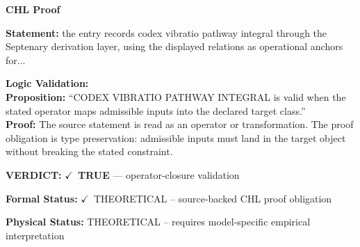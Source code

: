 \vspace{0.45em}
\noindent\textbf{CHL Proof}\par
\textbf{Statement:} the entry records codex vibratio pathway integral through the Septenary derivation
layer, using the displayed relations as operational anchors for...

\textbf{Logic Validation:}\\
\textbf{Proposition:} ``CODEX VIBRATIO PATHWAY INTEGRAL is valid when the stated operator maps admissible inputs
into the declared target class.''\\
\textbf{Proof:} The source statement is read as an operator or transformation. The proof obligation is
type preservation: admissible inputs must land in the target object without breaking the
stated constraint.

\textbf{VERDICT:} \ensuremath{\checkmark}\ \textbf{TRUE} --- operator-closure validation

\textbf{Formal Status:} \ensuremath{\checkmark}\ THEORETICAL -- source-backed CHL proof obligation

\textbf{Physical Status:} THEORETICAL -- requires model-specific empirical interpretation
\par\vspace{0.45em}
\par
\ifTZPDarkEdition
{}
\fi
\endgroup
\endgroup
